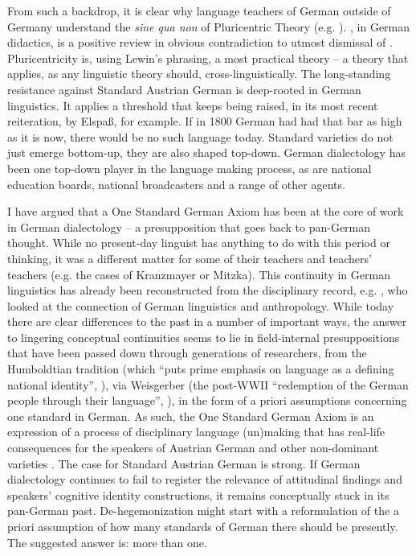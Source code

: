 \documentclass[output=paper]{langscibook}
\begin{document}
From such a backdrop, it is clear why language teachers of German outside of Germany understand the \textit{sine qua non} of Pluricentric Theory (e.g. \citealt{CalliesHehner2023}). \citet{Ruck2021}, in German didactics, is a positive review in obvious contradiction to  utmost dismissal of \citet{Dollinger2019c}. Pluricentricity is, using Lewin’s phrasing, a most practical theory -- a theory that applies, as any linguistic theory should, cross-linguistically. The long-standing resistance against Standard Austrian German is deep-rooted in German linguistics. It applies a threshold that keeps being raised, in its most recent reiteration, by Elspaß, for example. If in 1800 German had had that bar as high as it is now, there would be no such language today. Standard varieties do not just emerge bottom-up, they are also shaped top-down. German dialectology has been one top-down player in the language making process, as are national education boards, national broadcasters and a range of other agents.


I have argued that a One Standard German Axiom has been at the core of work in German dialectology -- a presupposition that goes back to pan-German thought. While no present-day linguist has anything to do with this period or thinking, it was a different matter for some of their teachers and teachers’ teachers (e.g. the cases of Kranzmayer or Mitzka). This continuity in German linguistics has already been reconstructed from the disciplinary record, e.g.  \citet[1--2]{Hutton1999}, who looked at the connection of German linguistics and anthropology. While today there are clear differences to the past in a number of important ways, the answer to lingering conceptual continuities seems to lie in field-internal presuppositions that have been passed down through generations of researchers, from the Humboldtian tradition (which “puts prime emphasis on language as a defining national identity”, \citealt[263]{Hutton1999}), via Weisgerber (the post-WWII “redemption of the German people through their language”, \citealt[143]{Hutton1999}), in the form of a priori assumptions concerning one standard in German. As such, the One Standard German Axiom is an expression of a process of disciplinary language (un)making that has real-life consequences for the speakers of Austrian German and other non-dominant varieties \citep[155--159]{Dollinger2021}. The case for Standard Austrian German is strong. If German dialectology continues to fail to register the relevance of attitudinal findings and speakers’ cognitive identity constructions, it remains conceptually stuck in its pan-German past. De-hegemonization might start with a reformulation of the a priori assumption of how many standards of German there should be presently. The suggested answer is: more than one.


\printbibliography[heading=subbibliography,notkeyword=this]
\end{document}
